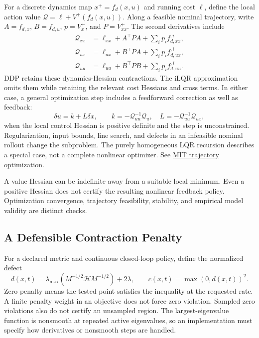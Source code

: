 \documentclass[
  10pt,
  letterpaper,
  DIV=11,
  numbers=noendperiod]{scrartcl}
\begin{document}
For a discrete dynamics map \(x^+=f_d(x,u)\) and running cost \(\ell\),
define the local action value \(\mathcal Q=\ell+V^+(f_d(x,u))\). Along a
feasible nominal trajectory, write \(A=f_{d,x}\), \(B=f_{d,u}\),
\(p=V_x^+\), and \(P=V_{xx}^+\). The second derivatives include \[
\begin{aligned}
\mathcal Q_{xx}&=\ell_{xx}+A^\top PA+\sum_i p_i f_{d,xx}^{,i},\\
\mathcal Q_{ux}&=\ell_{ux}+B^\top PA+\sum_i p_i f_{d,ux}^{,i},\\
\mathcal Q_{uu}&=\ell_{uu}+B^\top PB+\sum_i p_i f_{d,uu}^{,i}.
\end{aligned}
\] DDP retains these dynamics-Hessian contractions. The iLQR
approximation omits them while retaining the relevant cost Hessians and
cross terms. In either case, a general optimization step includes a
feedforward correction as well as feedback: \[
\delta u=k+L\delta x,\qquad
k=-\mathcal Q_{uu}^{-1}\mathcal Q_u,\quad
L=-\mathcal Q_{uu}^{-1}\mathcal Q_{ux},
\] when the local control Hessian is positive definite and the step is
unconstrained. Regularization, input bounds, line search, and defects in
an infeasible nominal rollout change the subproblem. The purely
homogeneous LQR recursion describes a special case, not a complete
nonlinear optimizer. See
\href{https://underactuated.mit.edu/trajopt.html}{MIT trajectory
optimization}.

A value Hessian can be indefinite away from a suitable local minimum.
Even a positive Hessian does not certify the resulting nonlinear
feedback policy. Optimization convergence, trajectory feasibility,
stability, and empirical model validity are distinct checks.

\subsection{A Defensible Contraction
Penalty}\label{a-defensible-contraction-penalty}

For a declared metric and continuous closed-loop policy, define the
normalized defect \[
d(x,t)=\lambda_{\max}\left(M^{-1/2}\mathcal H M^{-1/2}\right)+2\lambda,
\qquad c(x,t)=\max(0,d(x,t))^2.
\] Zero penalty means the tested point satisfies the inequality at the
requested rate. A finite penalty weight in an objective does not force
zero violation. Sampled zero violations also do not certify an unsampled
region. The largest-eigenvalue function is nonsmooth at repeated active
eigenvalues, so an implementation must specify how derivatives or
nonsmooth steps are handled.
\end{document}
